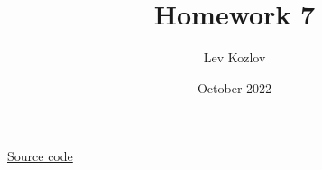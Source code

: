 \documentclass{article}
\title{Homework 7}
\author{Lev Kozlov}
\date{October 2022}
\begin{document}
\maketitle

\href{https://github.com/lvjonok/f22-theoretical-mechanics/tree/master/homework5}{Source code}


\end{document}
